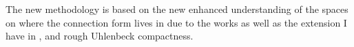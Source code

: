 \documentclass[12pt]{article}
\numberwithin{equation}{section}
\theoremstyle{definition}
\theoremstyle{remark}
\newcommand{\1}{\mathbf 1}
\newcommand{\<}{\langle}
\renewcommand{\>}{\rangle}
\begin{document}
The new methodology is based on the new enhanced understanding of the spaces on where the connection form lives in due to the works \cite{Chevyrev19,CCHS2d} as well as the extension I have in , and rough Uhlenbeck compactness. 




\end{document}
